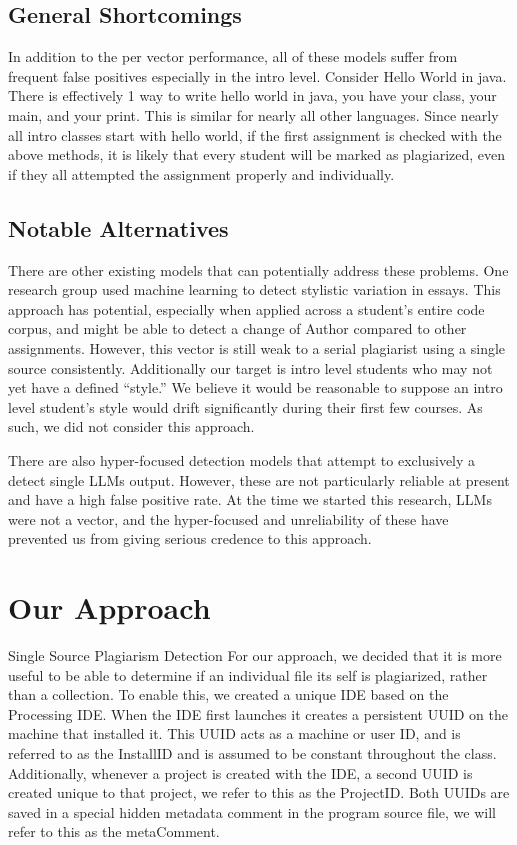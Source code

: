 \documentclass[letterpaper,10pt,conference]{IEEEtran}
\newcommand{\installID}{InstallID\xspace}
\newcommand{\projectID}{ProjectID\xspace}
\newcommand{\metaComment}{metaComment\xspace}
\begin{document}
\subsection{General Shortcomings}
In addition to the per vector performance, all of these models suffer from frequent false positives especially in the intro level.  Consider Hello World in java.  There is effectively 1 way to write hello world in java, you have your class, your main, and your print.  This is similar for nearly all other languages.  Since nearly all intro classes start with hello world, if the first assignment is checked with the above methods, it is likely that every student will be marked as plagiarized, even if they all attempted the assignment properly and individually.

\subsection{Notable Alternatives}
There are other existing models that can potentially address these problems.  One research group used machine learning to detect stylistic variation in essays. \cite{english}  This approach has potential, especially when applied across a student's entire code corpus, and might be able to detect a change of Author compared to other assignments.  However, this vector is still weak to a serial plagiarist using a single source consistently.  Additionally our target is intro level students who may not yet have a defined ``style.''  We believe it would be reasonable to suppose an intro level student's style would drift significantly during their first few courses.  As such, we did not consider this approach.

There are also hyper-focused detection models that attempt to exclusively a detect single LLMs output.\cite{llm detect}  However, these are not particularly reliable at present\cite{23 percent} and have a high false positive rate. \cite{and you fail}  At the time we started this research, LLMs were not a vector, and the hyper-focused and unreliability of these have prevented us from giving serious credence to this approach. 


\section{Our Approach} Single Source Plagiarism Detection
For our approach, we decided that it is more useful to be able to determine if an individual file its self is plagiarized, rather than a collection.  To enable this, we created a unique IDE based on the Processing IDE.  When the IDE first launches it creates a persistent UUID on the machine that installed it.  This UUID acts as a machine or user ID, and is referred to as the \installID and is assumed to be constant throughout the class.  Additionally, whenever a project is created with the IDE, a second UUID is created unique to that project, we refer to this as the \projectID.  Both UUIDs are saved in a special hidden metadata comment in the program source file, we will refer to this as the \metaComment.
\end{document}
